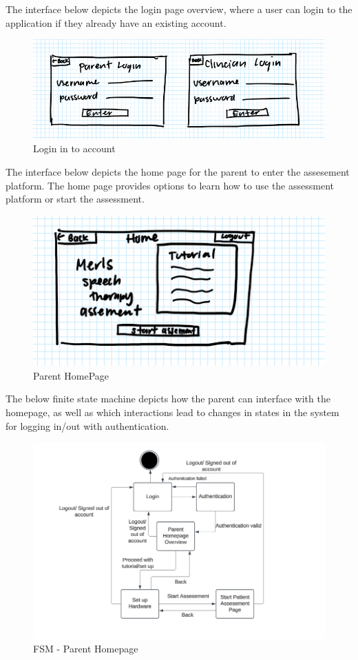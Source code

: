 \documentclass[12pt, titlepage]{article}
\begin{document}
\hspace{1.5em}The interface below depicts the login page overview, where a user can login to the application if they already have an existing account.
\begin{figure}[H]
  \centering
  \includegraphics[scale=0.9]{images/loginaccount.png}
  \caption{Login in to account}
\end{figure}

\hspace{1.5em}The interface below depicts the home page for the parent to enter the assesement platform. The home page provides options to learn how to use the assessment platform or start the assessment. 
\begin{figure}[H]
  \centering
  \includegraphics[scale=0.9]{images/homepage.png}
  \caption{Parent HomePage}
\end{figure}

\hspace{1.5em}The below finite state machine depicts how the parent can interface with the homepage, as well as which interactions lead to changes in states in the system for logging in/out with authentication.
\begin{figure}[H]
  \centering
  \includegraphics[scale=0.6]{images/FSM Homepage.png}
  \caption{FSM - Parent Homepage}
\end{figure}
\end{document}
